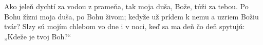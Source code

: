 Ako jeleň dychtí za vodou z prameňa,
tak moja duša, Bože, túži za tebou.
\versseparator
Po Bohu žízni moja duša, po Bohu živom;
kedyže už prídem k nemu a uzriem Božiu tvár?
\versseparator
Slzy sú mojím chlebom vo dne i v noci,
keď sa ma deň čo deň spytujú: „Kdeže je tvoj Boh?“